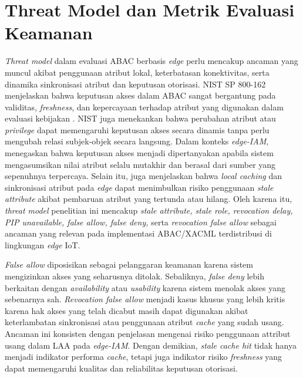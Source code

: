\section{Threat Model dan Metrik Evaluasi Keamanan} 

\textit{Threat model} dalam evaluasi ABAC berbasis \textit{edge} perlu mencakup ancaman yang muncul akibat penggunaan atribut lokal, keterbatasan konektivitas, serta dinamika sinkronisasi atribut dan keputusan otorisasi. NIST SP 800-162 menjelaskan bahwa keputusan akses dalam ABAC sangat bergantung pada validitas, \textit{freshness}, dan kepercayaan terhadap atribut yang digunakan dalam evaluasi kebijakan \parencite{hu_guide_2014}. NIST juga menekankan bahwa perubahan atribut atau \textit{privilege} dapat memengaruhi keputusan akses secara dinamis tanpa perlu mengubah relasi subjek-objek secara langsung. Dalam konteks \textit{edge-IAM}, \textcite{wang_edge-enabled_2025} menegaskan bahwa keputusan akses menjadi dipertanyakan apabila sistem mengasumsikan nilai atribut selalu mutakhir dan berasal dari sumber yang sepenuhnya terpercaya. Selain itu, \textcite{wang_edge-enabled_2025} juga menjelaskan bahwa \textit{local caching} dan sinkronisasi atribut pada \textit{edge} dapat menimbulkan risiko penggunaan \textit{stale attribute} akibat pembaruan atribut yang tertunda atau hilang. Oleh karena itu, \textit{threat model} penelitian ini mencakup \textit{stale attribute, stale role, revocation delay, PIP unavailable, false allow, false deny,} serta \textit{revocation false allow} sebagai ancaman yang relevan pada implementasi ABAC/XACML terdistribusi di lingkungan \textit{edge} IoT.

\textit{False allow} diposisikan sebagai pelanggaran keamanan karena sistem mengizinkan akses yang seharusnya ditolak. Sebaliknya, \textit{false deny} lebih berkaitan dengan \textit{availability} atau \textit{usability} karena sistem menolak akses yang sebenarnya sah. \textit{Revocation false allow} menjadi kasus khusus yang lebih kritis karena hak akses yang telah dicabut masih dapat digunakan akibat keterlambatan sinkronisasi atau penggunaan atribut \textit{cache} yang sudah usang. Ancaman ini konsisten dengan penjelasan \textcite{wang_edge-enabled_2025} mengenai risiko penggunaan attribut usang dalam LAA pada \textit{edge-IAM}. Dengan demikian, \textit{stale cache hit} tidak hanya menjadi indikator performa \textit{cache}, tetapi juga indikator risiko \textit{freshness} yang dapat memengaruhi kualitas dan reliabilitas keputusan otorisasi.

